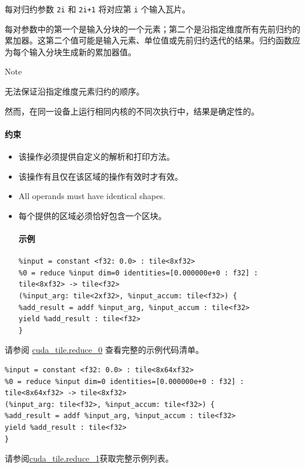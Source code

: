 \documentclass{article}
\begin{document}
每对归约参数 \texttt{2i} 和 \texttt{2i+1} 将对应第 \texttt{i} 个输入瓦片。

每对参数中的第一个是输入分块的一个元素；第二个是沿指定维度所有先前归约的累加器。这第二个值可能是输入元素、单位值或先前归约迭代的结果。归约函数应为每个输入分块生成新的累加器值。


Note


无法保证沿指定维度元素归约的顺序。

然而，在同一设备上运行相同内核的不同次执行中，结果是确定性的。



\paragraph{约束}

\begin{itemize}
\item 该操作必须提供自定义的解析和打印方法。
\item 该操作有且仅在该区域的操作有效时才有效。
\item All operands must have identical shapes.
\item 每个提供的区域必须恰好包含一个区块。


\paragraph{示例}

\begin{lstlisting}
%input = constant <f32: 0.0> : tile<8xf32>
%0 = reduce %input dim=0 identities=[0.000000e+0 : f32] : tile<8xf32> -> tile<f32>
(%input_arg: tile<2xf32>, %input_accum: tile<f32>) {
%add_result = addf %input_arg, %input_accum : tile<f32>
yield %add_result : tile<f32>
}
\end{lstlisting}

\end{itemize}
请参阅 \href{https://docs.nvidia.com/cuda/tile-ir/latest/sections/appendix.html#example-cuda-tile-reduce-0}{cuda\_tile.reduce\_0} 查看完整的示例代码清单。


\begin{lstlisting}
%input = constant <f32: 0.0> : tile<8x64xf32>
%0 = reduce %input dim=0 identities=[0.000000e+0 : f32] : tile<8x64xf32> -> tile<8xf32>
(%input_arg: tile<f32>, %input_accum: tile<f32>) {
%add_result = addf %input_arg, %input_accum : tile<f32>
yield %add_result : tile<f32>
}
\end{lstlisting}

请参阅\href{https://docs.nvidia.com/cuda/tile-ir/latest/sections/appendix.html#example-cuda-tile-reduce-1}{cuda\_tile.reduce\_1}获取完整示例列表。
\end{document}
